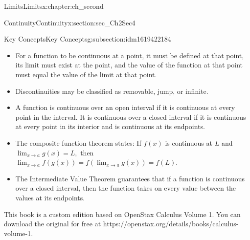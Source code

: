 \documentclass[oneside,10pt,]{book}
\numberwithin{equation}{section}
\begin{document}
\begin{chapterptx}{Limits}{}{Limits}{}{}{x:chapter:ch_second}
\begin{sectionptx}{Continuity}{}{Continuity}{}{}{x:section:sec_Ch2Sec4}
\begin{subsectionptx}{Key Concepts}{}{Key Concepts}{}{}{g:subsection:idm1619422184}
%
\begin{itemize}[label=\textbullet]
\item{}For a function to be continuous at a point, it must be defined at that point, its limit must exist at the point, and the value of the function at that point must equal the value of the limit at that point.%
\item{}Discontinuities may be classified as removable, jump, or infinite.%
\item{}A function is continuous over an open interval if it is continuous at every point in the interval. It is continuous over a closed interval if it is continuous at every point in its interior and is continuous at its endpoints.%
\item{}The composite function theorem states: If \(f(x)\) is continuous at \(L\) and \(\lim_{x\to a}g(x)=L,\) then \(\lim_{x\to a}f(g(x))=f(\lim_{x\to a}g(x))=f(L).\)%
\item{}The Intermediate Value Theorem guarantees that if a function is continuous over a closed interval, then the function takes on every value between the values at its endpoints.%
\end{itemize}
\end{subsectionptx}
This book is a custom edition based on OpenStax Calculus Volume 1. You can download the original for free at https:\slash{}\slash{}openstax.org\slash{}details\slash{}books\slash{}calculus-volume-1.%
\end{sectionptx}
\end{chapterptx}
%
%
\typeout{************************************************}
\typeout{************************************************}
%
\end{document}
